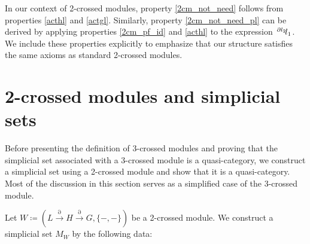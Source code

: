 \documentclass{tac}
\newcommand{\act}[1]{\,\sp{#1}\!}
\newcommand{\del}{\partial}
\begin{document}
\begin{rem}
In our context of 2-crossed modules, property \ref{2cm_not_need} follows from properties \ref{acthl} and \ref{actgl}. Similarly, property \ref{2cm_not_need_pl} can be derived by applying properties \ref{2cm_pf_id} and \ref{acthl} to the expression $\act{\del l_2}l_1$. We include these properties explicitly to emphasize that our structure satisfies the same axioms as standard 2-crossed modules.
\end{rem}

\section{2-crossed modules and simplicial sets}\label{sec-2-crossed module and sset}
Before presenting the definition of 3-crossed modules and proving that the simplicial set associated with a 3-crossed module is a quasi-category, we construct a simplicial set using a 2-crossed module and show that it is a quasi-category. Most of the discussion in this section serves as a simplified case of the 3-crossed module.

Let $W \coloneqq (L \xrightarrow{\partial} H \xrightarrow{\partial} G,\{-,-\} )$ be a 2-crossed module. We construct a simplicial set $M_W$ by the following data:
\end{document}

